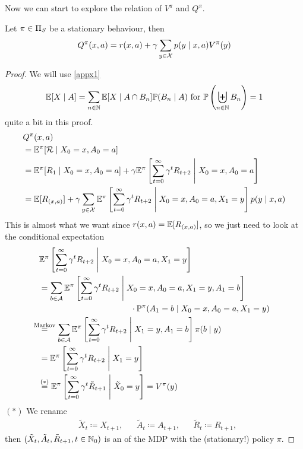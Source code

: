 Now we can start to explore the relation of \(V^\pi\) and \(Q^\pi\).

\begin{prop}\label{expand Q^pi} Let \(\pi\in\Pi_S\) be a stationary behaviour, then
	\[Q^\pi(x,a)=r(x,a)+\gamma\sum_{y\in\mathcal{X}}p(y\mid x,a)V^\pi(y)	\]
\end{prop}

\begin{proof} We will use \ref{appx1}
	\[
		\mathbb{E}[X\mid A]=\sum_{n\in\mathbb{N}} \mathbb{E}[X\mid A \cap B_n] \mathbb{P}(B_n \mid A) 
		\text{ for }\mathbb{P}\left(\biguplus_{n\in\mathbb{N}}B_n\right)=1 
	\]
	quite a bit in this proof.
\begin{align*}
&Q^\pi(x,a) \\
&= \mathbb{E}^\pi[\mathcal{R}\mid X_0=x, A_0=a]\\
&=\mathbb{E}^\pi[R_1\mid X_0=x,A_0=a]
+\gamma\mathbb{E}^\pi\left[\sum_{t=0}^\infty\gamma^t R_{t+2}\;\middle|\; X_0=x,A_0=a\right]\\
&=\mathbb{E}[R_{(x,a)}] 
 + \gamma \sum_{y\in\mathcal{X}}\mathbb{E}^\pi\left[\sum_{t=0}^\infty\gamma^t R_{t+2} \;\middle|\; X_0=x,A_0=a, X_1=y\right]p(y\mid x, a)\\
\end{align*}
This is almost what we want since \(r(x,a)=\mathbb{E}[R_{(x,a)}] \), so we just need to look at the conditional expectation
\begin{align*}
	&\E^\pi\left[\sum_{t=0}^\infty\gamma^t R_{t+2} \;\middle|\; X_0=x,A_0=a, X_1=y\right]\\
	&=\sum_{b\in\cA}
	\begin{aligned}[t]
	&\E^\pi\left[\sum_{t=0}^\infty\gamma^t R_{t+2} 
	\;\middle|\; X_0=x,A_0=a, X_1=y,A_1=b \right]\\
	&\qquad\qquad\qquad\qquad\cdot \Pr^\pi(A_1=b \mid X_0=x,A_0=a, X_1=y) 
	\end{aligned}
	\\
	&\lxeq{\text{Markov}} 
	\sum_{b\in\cA}\E^\pi\left[\sum_{t=0}^\infty\gamma^t R_{t+2} \;\middle|\; X_1=y,A_1=b \right]
	\pi(b\mid y)\\
	&= \E^\pi\left[\sum_{t=0}^\infty\gamma^t R_{t+2}\;\middle|\; X_1=y \right] \\
 	&\lxeq{(*)} \E^\pi\left[\sum_{t=0}^\infty\gamma^t \tilde{R}_{t+1}\;\middle|\; \tilde{X}_0=y \right]=V^\pi(y)
\end{align*}
\((*)\) We rename 
\begin{align*}
	&\tilde{X}_{t}\coloneqq X_{t+1}, && \tilde{A}_t\coloneqq A_{t+1},
	&&\tilde{R}_{t}\coloneqq R_{t+1},
\end{align*}
then \((\tilde{X}_t,\tilde{A}_t,\tilde{R}_{t+1}, t\in\mathbb{N}_0)\) is an  of the MDP with the (stationary!) policy \(\pi\).
\end{proof}

